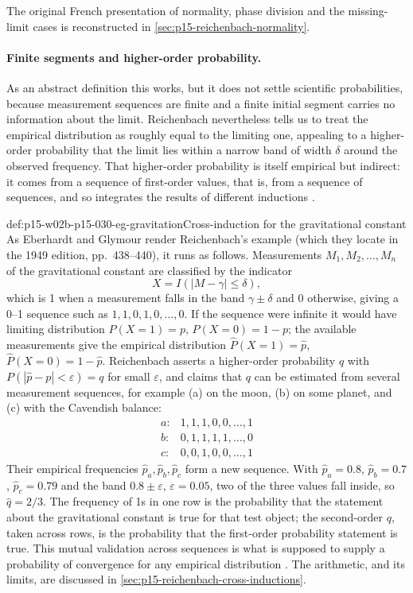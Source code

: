 The original French presentation of normality, phase division and the
missing-limit cases is reconstructed in
\cref{sec:p15-reichenbach-normality}.

\paragraph{Finite segments and higher-order probability.} As an abstract
definition this works, but it does not settle scientific probabilities,
because measurement sequences are finite and a finite initial segment
carries no information about the limit. Reichenbach nevertheless tells
us to treat the empirical distribution as roughly equal to the limiting
one, appealing to a higher-order probability that the limit lies within
a narrow band of width \(\delta\) around the observed frequency. That
higher-order probability is itself empirical but indirect: it comes from
a sequence of first-order values, that is, from a sequence of sequences,
and so integrates the results of different inductions
\cite[p.~365]{EberhardtGlymour2011ReichenbachReading}.

\begin{hbexample}{def:p15-w02b-p15-030-eg-gravitation}{Cross-induction for the gravitational constant}
As Eberhardt and Glymour render Reichenbach's example (which they locate
in the 1949 edition, pp.~438--440), it runs as follows. Measurements
\(M_1,M_2,\ldots,M_n\) of the gravitational constant are classified by
the indicator
\[
 X=I(|M-\gamma|\leq\delta),
\]
which is 1 when a measurement falls in the band \(\gamma\pm\delta\) and 0
otherwise, giving a 0--1 sequence such as \(1,1,0,1,0,\ldots,0\). If the
sequence were infinite it would have limiting distribution
\(P(X=1)=p\), \(P(X=0)=1-p\); the available measurements give the
empirical distribution \(\hat P(X=1)=\hat p\), \(\hat P(X=0)=1-\hat p\).
Reichenbach asserts a higher-order probability \(q\) with
\(P(|\hat p-p|<\varepsilon)=q\) for small \(\varepsilon\), and claims
that \(q\) can be estimated from several measurement sequences, for
example (a) on the moon, (b) on some planet, and (c) with the Cavendish
balance:
\[
\begin{array}{ll}
 a: & 1,1,1,0,0,\ldots,1\\
 b: & 0,1,1,1,1,\ldots,0\\
 c: & 0,0,1,0,0,\ldots,1
\end{array}
\]
Their empirical frequencies \(\hat p_a,\hat p_b,\hat p_c\) form a new
sequence. With \(\hat p_a=0.8\), \(\hat p_b=0.7\), \(\hat p_c=0.79\) and the
band \(0.8\pm\varepsilon\), \(\varepsilon=0.05\), two of the three values
fall inside, so \(\hat q=2/3\). The frequency of 1s in one row is the
probability that the statement about the gravitational constant is true
for that test object; the second-order \(q\), taken across rows, is the
probability that the first-order probability statement is true. This
mutual validation across sequences is what is supposed to supply a
probability of convergence for any empirical distribution
\cite[pp.~365--367]{EberhardtGlymour2011ReichenbachReading}. The
arithmetic, and its limits, are discussed in
\cref{sec:p15-reichenbach-cross-inductions}.
\end{hbexample}

